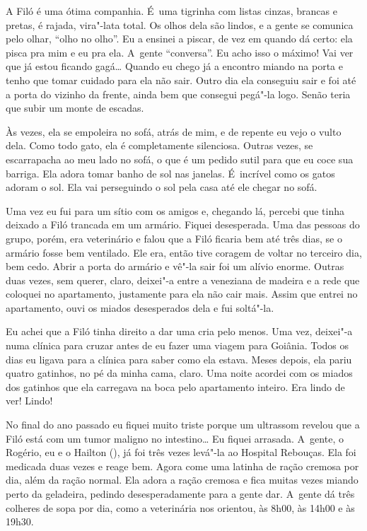 A Filó é uma ótima companhia. É~uma tigrinha com listas cinzas, brancas
e pretas, é rajada, vira"-lata total. Os olhos dela são lindos, e a gente
se comunica pelo olhar, ``olho no olho''. Eu a ensinei a piscar, de vez
em quando dá certo: ela pisca pra mim e eu pra ela. A~gente
``conversa''. Eu acho isso o máximo! Vai ver que já estou ficando
gagá… Quando eu chego já a encontro miando na porta e tenho que
tomar cuidado para ela não sair. Outro dia ela conseguiu sair e foi até
a porta do vizinho da frente, ainda bem que consegui pegá"-la logo. Senão
teria que subir um monte de escadas.

Às vezes, ela se empoleira no sofá, atrás de mim, e de repente eu vejo o
vulto dela. Como todo gato, ela é completamente silenciosa. Outras
vezes, se escarrapacha ao meu lado no sofá, o que é um pedido sutil para
que eu coce sua barriga. Ela adora tomar banho de sol nas janelas. É~incrível 
como os gatos adoram o sol. Ela vai perseguindo o sol pela casa
até ele chegar no sofá.

Uma vez eu fui para um sítio com os amigos e, chegando lá, percebi que
tinha deixado a Filó trancada em um armário. Fiquei desesperada. Uma das
pessoas do grupo, porém, era veterinário e falou que a Filó ficaria bem
até três dias, se o armário fosse bem ventilado. Ele era, então tive
coragem de voltar no terceiro dia, bem cedo. Abrir a porta do armário e
vê"-la sair foi um alívio enorme. Outras duas vezes, sem querer, claro,
deixei"-a entre a veneziana de madeira e a rede que coloquei no
apartamento, justamente para ela não cair mais. Assim que entrei no
apartamento, ouvi os miados desesperados dela e fui soltá"-la.

Eu achei que a Filó tinha direito a dar uma cria pelo menos. Uma vez,
deixei"-a numa clínica para cruzar antes de eu fazer uma viagem para
Goiânia. Todos os dias eu ligava para a clínica para saber como ela
estava. Meses depois, ela pariu quatro gatinhos, no pé da minha cama,
claro. Uma noite acordei com os miados dos gatinhos que ela carregava na
boca pelo apartamento inteiro. Era lindo de ver! Lindo!

No final do ano passado eu fiquei muito triste porque um ultrassom
revelou que a Filó está com um tumor maligno no intestino… Eu
fiquei arrasada. A~gente, o Rogério, eu e o Hailton (), já foi três
vezes levá"-la ao Hospital Rebouças. Ela foi medicada duas vezes e reage
bem. Agora come uma latinha de ração cremosa por dia, além da ração
normal. Ela adora a ração cremosa e fica muitas vezes miando perto da
geladeira, pedindo desesperadamente para a gente dar. A~gente dá três
colheres de sopa por dia, como a veterinária nos orientou, às 8h00, às
14h00 e às 19h30.


